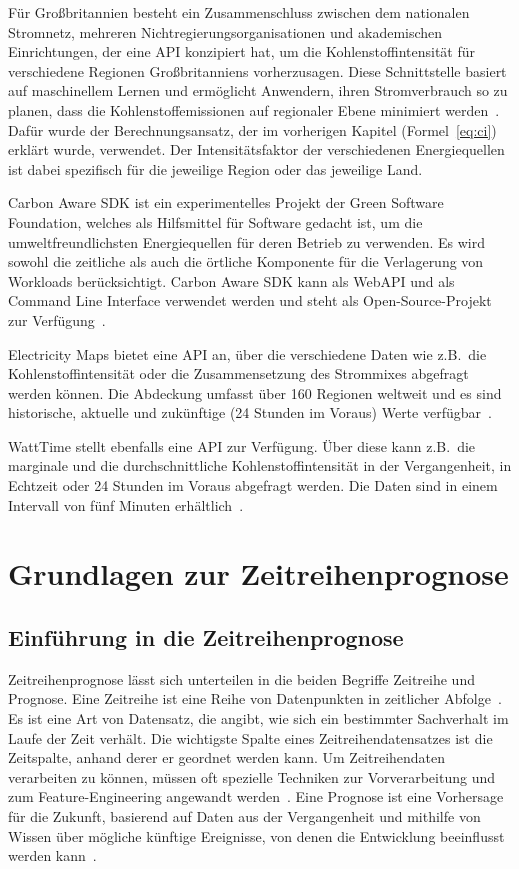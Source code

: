 Für Großbritannien besteht ein Zusammenschluss zwischen dem nationalen Stromnetz, mehreren Nichtregierungsorganisationen und akademischen Einrichtungen, der eine \ac{API} konzipiert hat, um die Kohlenstoffintensität für verschiedene Regionen Großbritanniens vorherzusagen.
Diese Schnittstelle basiert auf maschinellem Lernen und ermöglicht Anwendern, ihren Stromverbrauch so zu planen, dass die Kohlenstoffemissionen auf regionaler Ebene minimiert werden~\cite{Currie.2024}.
Dafür wurde der Berechnungsansatz, der im vorherigen Kapitel (Formel~\ref{eq:ci}) erklärt wurde, verwendet.
Der Intensitätsfaktor der verschiedenen Energiequellen ist dabei spezifisch für die jeweilige Region oder das jeweilige Land.

Carbon Aware \ac{SDK} ist ein experimentelles Projekt der Green Software Foundation, welches als Hilfsmittel für Software gedacht ist, um die umweltfreundlichsten Energiequellen für deren Betrieb zu verwenden.
Es wird sowohl die zeitliche als auch die örtliche Komponente für die Verlagerung von Workloads berücksichtigt.
Carbon Aware \ac{SDK} kann als Web\ac{API} und als Command Line Interface verwendet werden und steht als Open-Source-Projekt zur Verfügung~\cite{GreenSoftwareFoundation.20231212T09:58:27.000Z}.

Electricity Maps bietet eine \ac{API} an, über die verschiedene Daten wie z.B.\ die Kohlenstoffintensität oder die Zusammensetzung des Strommixes abgefragt werden können.
Die Abdeckung umfasst über 160 Regionen weltweit und es sind historische, aktuelle und zukünftige (24 Stunden im Voraus) Werte verfügbar~\cite{ElectricityMaps.20231220T09:16:49.000Z}.

WattTime stellt ebenfalls eine \ac{API} zur Verfügung.
Über diese kann z.B.\ die marginale und die durchschnittliche Kohlenstoffintensität in der Vergangenheit, in Echtzeit oder 24 Stunden im Voraus abgefragt werden.
Die Daten sind in einem Intervall von fünf Minuten erhältlich~\cite{WattTime.20231130T19:28:06+00:00}.

\chapter{Grundlagen zur Zeitreihenprognose}
\section{Einführung in die Zeitreihenprognose}\label{CAP:intor-time-series-forecasting}
Zeitreihenprognose lässt sich unterteilen in die beiden Begriffe Zeitreihe und Prognose.
Eine Zeitreihe ist eine Reihe von Datenpunkten in zeitlicher Abfolge~\cite{Peixeiro.2022}.
Es ist eine Art von Datensatz, die angibt, wie sich ein bestimmter Sachverhalt im Laufe der Zeit verhält.
Die wichtigste Spalte eines Zeitreihendatensatzes ist die Zeitspalte, anhand derer er geordnet werden kann.
Um Zeitreihendaten verarbeiten zu können, müssen oft spezielle Techniken zur Vorverarbeitung und zum Feature-Engineering angewandt werden~\cite{Lazzeri.2021}.
Eine Prognose ist eine Vorhersage für die Zukunft, basierend auf Daten aus der Vergangenheit und mithilfe von Wissen über mögliche künftige Ereignisse, von denen die Entwicklung beeinflusst werden kann~\cite{Peixeiro.2022}.

